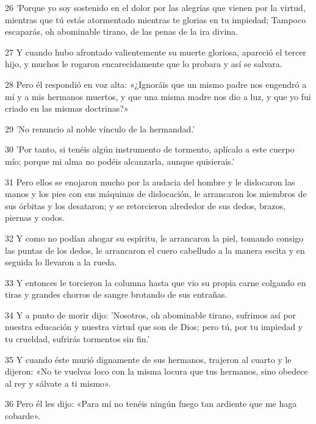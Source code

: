 \par 26 'Porque yo soy sostenido en el dolor por las alegrías que vienen por la virtud, mientras que tú estás atormentado mientras te glorias en tu impiedad; Tampoco escaparás, oh abominable tirano, de las penas de la ira divina.

\par 27 Y cuando hubo afrontado valientemente su muerte gloriosa, apareció el tercer hijo, y muchos le rogaron encarecidamente que lo probara y así se salvara.

\par 28 Pero él respondió en voz alta: «¿Ignoráis que un mismo padre nos engendró a mí y a mis hermanos muertos, y que una misma madre nos dio a luz, y que yo fui criado en las mismas doctrinas?»

\par 29 'No renuncio al noble vínculo de la hermandad.'

\par 30 'Por tanto, si tenéis algún instrumento de tormento, aplícalo a este cuerpo mío; porque mi alma no podéis alcanzarla, aunque quisierais.'

\par 31 Pero ellos se enojaron mucho por la audacia del hombre y le dislocaron las manos y los pies con sus máquinas de dislocación, le arrancaron los miembros de sus órbitas y los desataron; y se retorcieron alrededor de sus dedos, brazos, piernas y codos.

\par 32 Y como no podían ahogar su espíritu, le arrancaron la piel, tomando consigo las puntas de los dedos, le arrancaron el cuero cabelludo a la manera escita y en seguida lo llevaron a la rueda.

\par 33 Y entonces le torcieron la columna hasta que vio su propia carne colgando en tiras y grandes chorros de sangre brotando de sus entrañas.

\par 34 Y a punto de morir dijo: 'Nosotros, oh abominable tirano, sufrimos así por nuestra educación y nuestra virtud que son de Dios; pero tú, por tu impiedad y tu crueldad, sufrirás tormentos sin fin.'

\par 35 Y cuando éste murió dignamente de sus hermanos, trajeron al cuarto y le dijeron: «No te vuelvas loco con la misma locura que tus hermanos, sino obedece al rey y sálvate a ti mismo».

\par 36 Pero él les dijo: «Para mí no tenéis ningún fuego tan ardiente que me haga cobarde».

